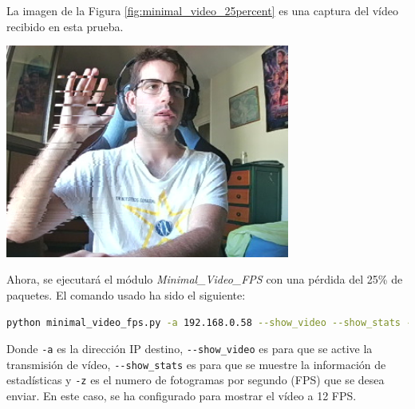 \newpage
La imagen de la Figura \ref{fig:minimal_video_25percent} es una captura del vídeo recibido en esta prueba.
\begin{center}
  \includegraphics[width = 0.7\textwidth]{images/VideoRecibido8.1.png}
  \label{fig:minimal_video_25percent}
\end{center}

\newpage


Ahora, se ejecutará el módulo \textit{Minimal\_Video\_FPS} con una pérdida del 25\% de paquetes. El comando usado ha sido el siguiente:

\begin{lstlisting}[language=bash, basicstyle=\ttfamily\scriptsize]
    python minimal_video_fps.py -a 192.168.0.58 --show_video --show_stats -z 12
\end{lstlisting}
Donde \verb|-a| es la dirección IP destino, \verb|--show_video| es para que se active la transmisión de vídeo, \verb|--show_stats| es para que se muestre la información de estadísticas y \verb|-z| es el numero de fotogramas por segundo (FPS) que se desea enviar. En este caso, se ha configurado para mostrar el vídeo a 12 FPS.
\vspace{\baselineskip}

